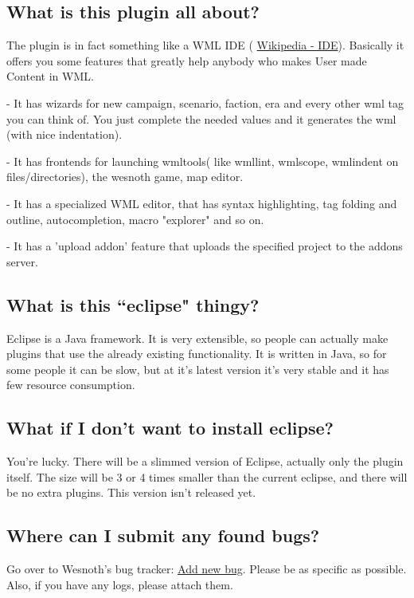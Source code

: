 \documentclass[10pt]{article}
\begin{document}
\subsection{What is this plugin all about?}
The plugin is in fact something like a WML IDE ( \href{http://en.wikipedia.org/wiki/Integrated_development_environment}{Wikipedia - IDE}). Basically it offers you some features that greatly help anybody who makes User made Content in WML.
\begin{description}
\item- It has wizards for new campaign, scenario, faction, era and every other wml tag you can think of. You just complete the needed values and it generates the wml (with nice indentation).
\item- It has frontends for launching wmltools( like wmllint, wmlscope, wmlindent on files/directories), the wesnoth game, map editor.
\item- It has a specialized WML editor, that has syntax highlighting, tag folding and outline, autocompletion, macro "explorer" and so on.
\item- It has a 'upload addon' feature that uploads the specified project to the addons server.
\end{description}

\subsection{What is this ``eclipse" thingy?}
Eclipse is a Java framework. It is very extensible, so people can actually make plugins that use the already existing functionality. It is written in Java, so for some people it can be slow, but at it's latest version it's very stable and it has few resource consumption.

\subsection{What if I don't want to install eclipse?}
You're lucky. There will be a slimmed version of Eclipse, actually only the plugin itself. The size will be 3 or 4 times smaller than the current eclipse, and there will be no extra plugins. This version isn't released yet.

\subsection{Where can I submit any found bugs?}
Go over to Wesnoth's bug tracker: \href{https://gna.org/bugs/?func=additem&group=wesnoth&bug_group_id=116}{Add new bug}. Please be as specific as possible. Also, if you have any logs, please attach them.
\end{document}
